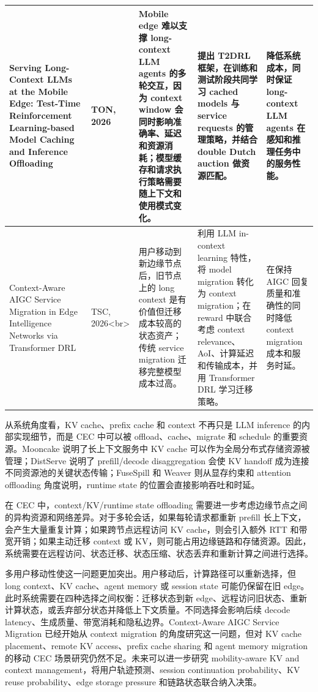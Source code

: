 \documentclass[a4paper,10pt]{ctexart}
\begin{document}
\begin{table}[H]
\begin{tabularx}{\textwidth}{|X|X|X|X|X|}
Serving Long-Context LLMs at the Mobile Edge: Test-Time Reinforcement Learning-based Model Caching and Inference Offloading & TON, 2026 & Mobile edge 难以支撑 long-context LLM agents 的多轮交互，因为 context window 会同时影响准确率、延迟和资源消耗；模型缓存和请求执行策略需要随上下文和使用模式变化。 & 提出 T2DRL 框架，在训练和测试阶段共同学习 cached models 与 service requests 的管理策略，并结合 double Dutch auction 做资源匹配。 & 降低系统成本，同时保证 long-context LLM agents 在感知和推理任务中的服务性能。 \\ \hline
Context-Aware AIGC Service Migration in Edge Intelligence Networks via Transformer DRL & TSC, 2026<br> & 用户移动到新边缘节点后，旧节点上的 long context 是有价值但迁移成本较高的状态资产；传统 service migration 迁移完整模型成本过高。 & 利用 LLM in-context learning 特性，将 model migration 转化为 context migration；在 reward 中联合考虑 context relevance、AoI、计算延迟和传输成本，并用 Transformer DRL 学习迁移策略。 & 在保持 AIGC 回复质量和准确性的同时降低 context migration 成本和服务时延。 \\ \hline
\end{tabularx}
\end{table}


从系统角度看，KV cache、prefix cache 和 context 不再只是 LLM inference 的内部实现细节，而是 CEC 中可以被 offload、cache、migrate 和 schedule 的重要资源。Mooncake 说明了长上下文服务中 KV cache 可以作为全局分布式存储资源被管理；DistServe 说明了 prefill/decode disaggregation 会使 KV handoff 成为连接不同资源池的关键状态传输；FuseSpill 和 Weaver 则从显存约束和 attention offloading 角度说明，runtime state 的位置会直接影响吞吐和时延。


在 CEC 中，context/KV/runtime state offloading 需要进一步考虑边缘节点之间的异构资源和网络差异。对于多轮会话，如果每轮请求都重新 prefill 长上下文，会产生大量重复计算；如果跨节点远程访问 KV cache，则会引入额外 RTT 和带宽开销；如果主动迁移 context 或 KV，则可能占用边缘链路和存储资源。因此，系统需要在远程访问、状态迁移、状态压缩、状态丢弃和重新计算之间进行选择。


多用户移动性使这一问题更加突出。用户移动后，计算路径可以重新选择，但 long context、KV cache、agent memory 或 session state 可能仍保留在旧 edge。此时系统需要在四种选择之间权衡：迁移状态到新 edge、远程访问旧状态、重新计算状态，或丢弃部分状态并降低上下文质量。不同选择会影响后续 decode latency、生成质量、带宽消耗和隐私边界。Context-Aware AIGC Service Migration 已经开始从 context migration 的角度研究这一问题，但对 KV cache placement、remote KV access、prefix cache sharing 和 agent memory migration 的移动 CEC 场景研究仍然不足。未来可以进一步研究 mobility-aware KV and context management，将用户轨迹预测、session continuation probability、KV reuse probability、edge storage pressure 和链路状态联合纳入决策。
\end{document}
